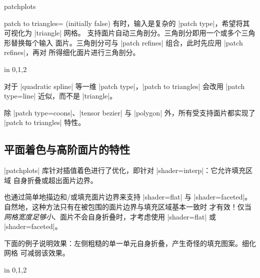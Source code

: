 {\begin{pgfplotslibrary}{patchplots}
\begin{pgfplotskey}{patch to triangles= (initially false)}
    有时，输入是复杂的 |patch type|，希望将其可视化为 |triangle| 网格。
    \PGFPlots{} 支持面片自动三角剖分。三角剖分即用一个或多个三角形替换每个输入
    面片。三角剖分可与 |patch refines| 组合，此时先应用 |patch refines|，再对
    所得细化面片进行三角剖分。
\begin{codeexample}[]
\foreach \level in {0,1,2} {%
}
\end{codeexample}

    对于 |quadratic spline| 等一维 |patch type|，|patch to triangles| 会改用
    |patch type=line| 近似，而不是 |triangle|。

    除 |patch type=coons|、|tensor bezier| 与 |polygon| 外，所有受支持面片都实现了
    |patch to triangles| 特性。
\end{pgfplotskey}


\subsection{平面着色与高阶面片的特性}
\label{sec:lib:patchplots:flat}

|patchplots| 库针对插值着色进行了优化，即针对 |shader=interp|：它允许填充区域
自身折叠或超出面片边界。

\PGFPlots{} 也通过简单地描边和/或填充面片边界来支持 |shader=flat| 与
|shader=faceted|。自然地，这种方法只有在被包围的面片边界与填充区域基本一致时
才有效！仅当\emph{网格宽度足够小}、面片不会自身折叠时，才考虑使用
|shader=flat| 或 |shader=faceted|。

下面的例子说明效果：左侧粗糙的单一单元自身折叠，产生奇怪的填充图案。细化网格
可减弱该效果。
%
\begin{codeexample}[]
\foreach \level in {0,1,2} {%
}
\end{codeexample}



\end{pgfplotslibrary}}
